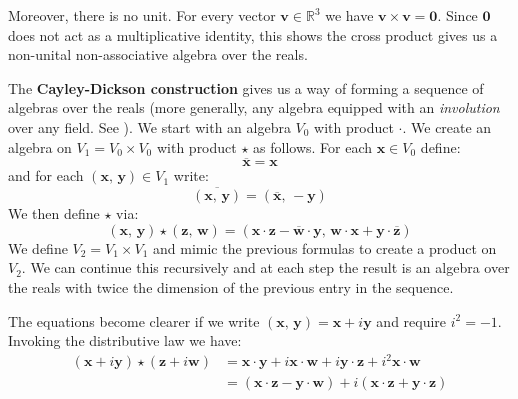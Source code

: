\documentclass{article}
\theoremstyle{plain}
\theoremstyle{normal}
\begin{document}
            Moreover, there is no unit. For every vector
            $\mathbf{v}\in\mathbb{R}^{3}$ we have
            $\mathbf{v}\times\mathbf{v}=\mathbf{0}$. Since $\mathbf{0}$ does
            not act as a multiplicative identity, this shows the cross product
            gives us a non-unital non-associative algebra over the reals.
            \par\hfill\par
            The \textbf{Cayley-Dickson construction} gives us a way of forming
            a sequence of algebras over the reals
            (more generally, any algebra equipped with an
            \textit{involution} over any field. See
            \cite[p.~45]{SchaferNonassociativeAlgebras}).
            We start with an algebra $V_{0}$ with product $\cdot$.
            We create an algebra on $V_{1}=V_{0}\times{V}_{0}$ with product
            $\star$ as follows. For each $\mathbf{x}\in{V}_{0}$ define:
            \begin{equation}
                \overline{\mathbf{x}}=\mathbf{x}
            \end{equation}
            and for each $(\mathbf{x},\,\mathbf{y})\in{V}_{1}$ write:
            \begin{equation}
                \overline{(\mathbf{x},\,\mathbf{y})}
                =(\overline{\mathbf{x}},\,-\mathbf{y})
            \end{equation}
            We then define $\star$ via:
            \begin{equation}
                (\mathbf{x},\,\mathbf{y})\star(\mathbf{z},\,\mathbf{w})
                =(\mathbf{x}\cdot\mathbf{z}-
                    \overline{\mathbf{w}}\cdot\mathbf{y},\,
                \mathbf{w}\cdot\mathbf{x}+
                    \mathbf{y}\cdot\overline{\mathbf{z}})
            \end{equation}
            We define $V_{2}=V_{1}\times{V}_{1}$ and mimic the previous formulas
            to create a product on $V_{2}$. We can continue this recursively
            and at each step the result is an algebra over the reals with twice
            the dimension of the previous entry in the sequence.
            \par\hfill\par
            The equations become clearer if we write
            $(\mathbf{x},\,\mathbf{y})=\mathbf{x}+i\mathbf{y}$ and require
            $i^{2}=-1$. Invoking the distributive law we have:
            \begin{subequations}
                \begin{align}
                    (\mathbf{x}+i\mathbf{y})\star(\mathbf{z}+i\mathbf{w})
                    &=\mathbf{x}\cdot\mathbf{y}
                        +i\mathbf{x}\cdot\mathbf{w}
                        +i\mathbf{y}\cdot\mathbf{z}
                        +i^{2}\mathbf{x}\cdot\mathbf{w}\\
                    &=(\mathbf{x}\cdot\mathbf{z}-\mathbf{y}\cdot\mathbf{w})
                        +i(\mathbf{x}\cdot\mathbf{z}+\mathbf{y}\cdot\mathbf{z})
                \end{align}
            \end{subequations}
\end{document}
